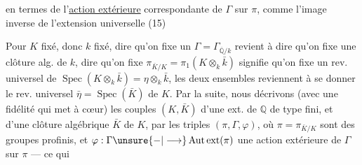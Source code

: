 en termes de  l'\uline{action extérieure} correspondante de $\Gamma$ sur $\pi$, comme l'image inverse de l'extension universelle
\noindent (15)\quad{}

Pour $K$ fixé, donc $k$ fixé, dire qu'on fixe un $\Gamma=\Gamma_{\overline{\mathbb Q}/k}$ revient à dire qu'on fixe une clôture alg. de $k$, dire qu'on fixe  $\pi_{\bar K/K}=\pi_1(K\otimes_k\bar k)$ signifie  qu'on fixe un rev. universel de $\operatorname{Spec}(K\otimes_k\bar k)=\eta\otimes_k\bar k$,  les deux ensembles reviennent à se donner le rev. universel  $\bar\eta=\operatorname{Spec}(\bar K)$ de $K$. Par la suite, nous décrivons (avec une fidélité qui met à cœur) les couples $(K,\bar K)$ d'une ext. de $\mathbb Q$ de type fini, et d'une clôture algébrique $\bar K$ de $K$, par les triples $(\pi,\Gamma,\varphi)$, où $\pi=\pi_{\bar K/K}$  sont des groupes profinis, et $\varphi:\Gamma\unsure{-|\longrightarrow}\operatorname{Aut\,ext}(\pi)$ une action extérieure de $\Gamma$ sur $\pi$ --- ce qui
